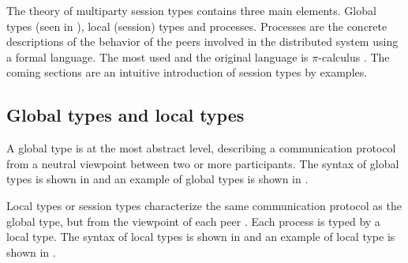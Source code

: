 The theory of multiparty session types contains three main elements. Global types (seen in ), local (session) types and processes. Processes are the concrete descriptions of the behavior of the peers involved in the distributed system \cite{coppoGentleIntroductionMultiparty2015} using a formal language. The most used and the original language is $\pi$-calculus \cite{milnerCalculusMobileProcesses1992}. The coming sections are an intuitive introduction of session types by examples.
\subsection{Global types and local types} \label{b:mpst:st}
A global type is at the most abstract level, describing a communication protocol from a neutral viewpoint between two or more participants\cite{coppoGentleIntroductionMultiparty2015}. The syntax of global types is shown in  and an example of global types is shown in .

Local types or session types characterize the same communication protocol as the global type, but from the viewpoint of each peer \cite{coppoGentleIntroductionMultiparty2015}. Each process is typed by a local type. The syntax of local types is shown in  and an example of local type is shown in . 

